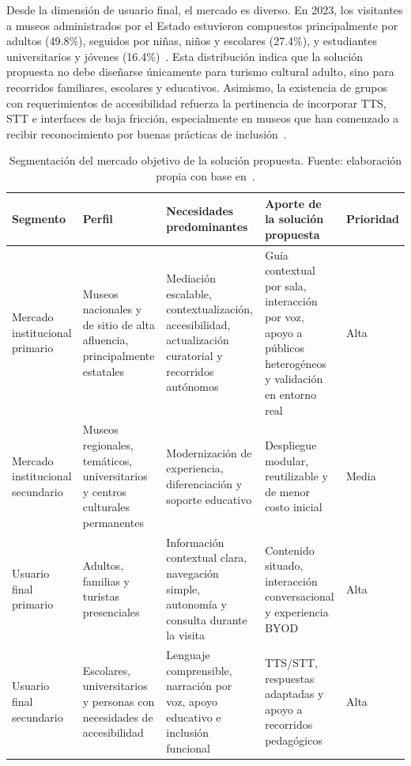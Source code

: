 Desde la dimensión de usuario final, el mercado es diverso. En 2023, los visitantes a museos administrados por el Estado estuvieron compuestos principalmente por adultos (49.8\%), seguidos por niñas, niños y escolares (27.4\%), y estudiantes universitarios y jóvenes (16.4\%)~\cite{infocultura2023visitantes}. Esta distribución indica que la solución propuesta no debe diseñarse únicamente para turismo cultural adulto, sino para recorridos familiares, escolares y educativos. Asimismo, la existencia de grupos con requerimientos de accesibilidad refuerza la pertinencia de incorporar TTS, STT e interfaces de baja fricción, especialmente en museos que han comenzado a recibir reconocimiento por buenas prácticas de inclusión~\cite{cultura2025tur4all}.

\begin{table}[h!]
	\centering
	\footnotesize
	\setlength{\tabcolsep}{3pt}
	\begin{tabular}{>{\raggedright\arraybackslash}p{2.8cm} >{\raggedright\arraybackslash}p{3.1cm} >{\raggedright\arraybackslash}p{3.2cm} >{\raggedright\arraybackslash}p{3.1cm} >{\raggedright\arraybackslash}p{1.8cm}}
		\hline
		\textbf{Segmento} & \textbf{Perfil} & \textbf{Necesidades predominantes} & \textbf{Aporte de la solución propuesta} & \textbf{Prioridad} \\
		\hline
		Mercado institucional primario & Museos nacionales y de sitio de alta afluencia, principalmente estatales & Mediación escalable, contextualización, accesibilidad, actualización curatorial y recorridos autónomos & Guía contextual por sala, interacción por voz, apoyo a públicos heterogéneos y validación en entorno real & Alta \\
		Mercado institucional secundario & Museos regionales, temáticos, universitarios y centros culturales permanentes & Modernización de experiencia, diferenciación y soporte educativo & Despliegue modular, reutilizable y de menor costo inicial & Media \\
		Usuario final primario & Adultos, familias y turistas presenciales & Información contextual clara, navegación simple, autonomía y consulta durante la visita & Contenido situado, interacción conversacional y experiencia BYOD & Alta \\
		Usuario final secundario & Escolares, universitarios y personas con necesidades de accesibilidad & Lenguaje comprensible, narración por voz, apoyo educativo e inclusión funcional & TTS/STT, respuestas adaptadas y apoyo a recorridos pedagógicos & Alta \\
		\hline
	\end{tabular}
	\caption[Segmentación del mercado objetivo de la solución propuesta]{Segmentación del mercado objetivo de la solución propuesta. Fuente: elaboración propia con base en~\cite{museoscultura,infocultura2023visitantes,osiptel2024smartphone}.}
\end{table}

